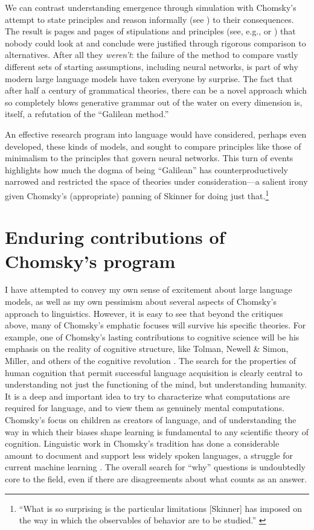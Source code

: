 \documentclass[output=paper,colorlinks,citecolor=brown
]{langscibook}
\begin{document}
We can contrast understanding emergence through simulation with Chomsky's attempt to state principles and reason informally (see \cite{pullum1989formal}) to their consequences. The result is pages and pages of stipulations and principles (see, e.g., \cite{collins2016formalization} or \cite{chomsky1995minimalist}) that nobody could look at and conclude were justified through rigorous comparison to alternatives. After all they \emph{weren't}: the failure of the method to compare vastly different sets of starting assumptions, including neural networks, is part of why modern large language models have taken everyone by surprise. The fact that after half a century of grammatical theories, there can be a novel approach which so completely blows generative grammar out of the water on every dimension is, itself, a refutation of the ``Galilean method.''

An effective research program into language would have considered, perhaps even developed, these kinds of models, and sought to compare principles like those of minimalism to the principles that govern neural networks. This turn of events highlights how much the dogma of being ``Galilean'' has counterproductively narrowed and restricted the space of theories under consideration---a salient irony given Chomsky's (appropriate) panning of Skinner for doing just that.\footnote{ ``What is so surprising is the particular limitations [Skinner] has imposed on the way in which the observables of behavior are to be studied.'' \citep{chomsky1959chomsky}} 

%

\section*{Enduring contributions of Chomsky's program}

I have attempted to convey my own sense of excitement about large language models, as well as my own pessimism about several aspects of Chomsky's approach to linguistics. However, it is easy to see that beyond the critiques above, many of Chomsky's emphatic focuses will survive his specific theories. For example, one of Chomsky's lasting contributions to cognitive science will be his emphasis on the reality of cognitive structure, like Tolman, Newell \& Simon, Miller, and others of the cognitive revolution \citep{nadel2003cognitive,margaret2008mind}. The search for the properties of human cognition that permit successful language acquisition is clearly central to understanding not just the functioning of the mind, but understanding humanity. It is a deep and important idea to try to characterize what computations are required for language, and to view them as genuinely mental computations. Chomsky's focus on children as creators of language, and of understanding the way in which their biases shape learning is fundamental to any scientific theory of cognition. Linguistic work in Chomsky's tradition has done a considerable amount to document and support less widely spoken languages, a struggle for current machine learning \citep{blasi2021systematic}. The overall search for ``why'' questions is undoubtedly core to the field, even if there are disagreements about what counts as an answer.
\end{document}
